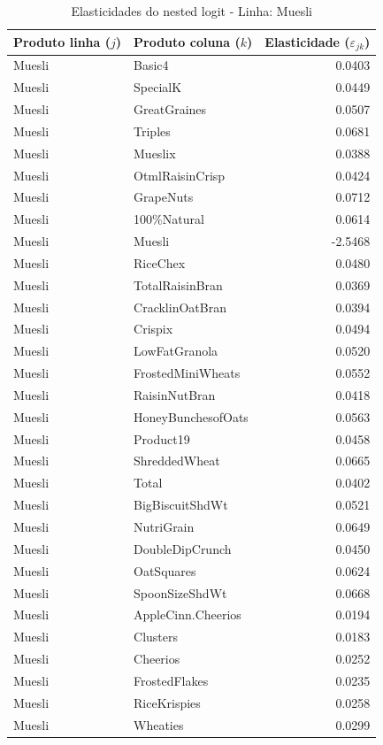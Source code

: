 \begingroup
\begin{table}[H]
\centering
\caption{Elasticidades do nested logit - Linha: Muesli}
\label{tab:elas-nested-muesli}
\small
\begin{tabular}{llr}
\toprule
Produto linha ($j$) & Produto coluna ($k$) & Elasticidade ($\varepsilon_{jk}$) \\
\midrule
Muesli & Basic4 & 0.0403 \\
Muesli & SpecialK & 0.0449 \\
Muesli & GreatGraines & 0.0507 \\
Muesli & Triples & 0.0681 \\
Muesli & Mueslix & 0.0388 \\
Muesli & OtmlRaisinCrisp & 0.0424 \\
Muesli & GrapeNuts & 0.0712 \\
Muesli & 100\%Natural & 0.0614 \\
Muesli & Muesli & -2.5468 \\
Muesli & RiceChex & 0.0480 \\
Muesli & TotalRaisinBran & 0.0369 \\
Muesli & CracklinOatBran & 0.0394 \\
Muesli & Crispix & 0.0494 \\
Muesli & LowFatGranola & 0.0520 \\
Muesli & FrostedMiniWheats & 0.0552 \\
Muesli & RaisinNutBran & 0.0418 \\
Muesli & HoneyBunchesofOats & 0.0563 \\
Muesli & Product19 & 0.0458 \\
Muesli & ShreddedWheat & 0.0665 \\
Muesli & Total & 0.0402 \\
Muesli & BigBiscuitShdWt & 0.0521 \\
Muesli & NutriGrain & 0.0649 \\
Muesli & DoubleDipCrunch & 0.0450 \\
Muesli & OatSquares & 0.0624 \\
Muesli & SpoonSizeShdWt & 0.0668 \\
Muesli & AppleCinn.Cheerios & 0.0194 \\
Muesli & Clusters & 0.0183 \\
Muesli & Cheerios & 0.0252 \\
Muesli & FrostedFlakes & 0.0235 \\
Muesli & RiceKrispies & 0.0258 \\
Muesli & Wheaties & 0.0299 \\

\end{tabular}
\end{table}
